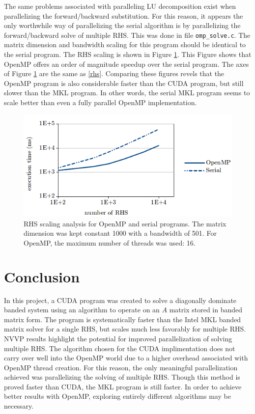 \documentclass[12pt]{article}
\begin{document}
The same problems associated with paralleling LU decomposition exist when
parallelizing the forward/backward substitution. For this reason, it appears
the only worthwhile way of parallelizing the serial algorithm is by
parallelizing the forward/backward solve of multiple RHS. This was done in file
\texttt{omp\_solve.c}. The matrix dimension and bandwidth scaling for this
program should be identical to the serial program. The RHS scaling is shown in
Figure \ref{omprhs}. This Figure shows that OpenMP offers an order of magnitude
speedup over the serial program. The axes of Figure \ref{omprhs} are the same
as \ref{rhs}. Comparing these figures revels that the OpenMP program is also
considerable faster than the CUDA program, but still slower than the MKL program. In other words, the serial MKL program seems to scale better than even a fully parallel OpenMP implementation.

\begin{figure}[H]
\caption{RHS scaling analysis for OpenMP and serial programs. The matrix dimension was kept constant 1000 with a bandwidth of 501. For OpenMP, the maximum number of threads was used: 16.}
\label{omprhs}
\centerline{\includegraphics[width=12cm]{omp_rhs.png}}
\end{figure}

\section{Conclusion}
\label{sec:conclusion}

In this project, a CUDA program was created to solve a diagonally dominate
banded system using an algorithm to operate on an $A$ matrix stored in banded
matrix form. The program is systematically faster than the Intel MKL banded
matrix solver for a single RHS, but scales much less favorably for multiple
RHS. NVVP results highlight the potential for improved parallelization of
solving multiple RHS. The algorithm chosen for the CUDA implimentation
does not carry over well into the OpenMP world due to a higher overhead
associated with OpenMP thread creation. For this reason, the only meaningful
parallelization achieved was parallelizing the solving of multiple RHS. Though
this method is proved faster than CUDA, the MKL program is still faster. In order
to achieve better results with OpenMP, exploring entirely different algorithms
may be necessary.
\end{document}
